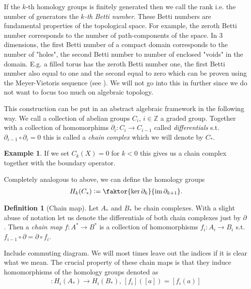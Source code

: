 \documentclass[12pt,a4paper]{article}
\numberwithin{equation}{subsection}
\numberwithin{lemma}{subsection}
\theoremstyle{definition}
\newtheorem{definition}[lemma]{Definition}
\newtheorem{example}[lemma]{Example}
\DeclareMathOperator{\Ima}{im}
\newcommand{\integers}{\mathbb{Z}}
\begin{document}
If the $k$-th homology groups is finitely generated then we 
call the rank i.e. the number of generators the \textit{$k$-th Betti number}. 
These Betti numbers are fundamental properties of the topological space. 
For example, the zeroth Betti number corresponds to the number of 
path-components of the space. In 3 dimensions, the first Betti number of 
a compact domain
corresponds to the number of "holes", the second Betti number to 
number of enclosed "voids" in the domain. E.g. a filled torus 
has the zeroth Betti number one, the first Betti number also equal to one
and the second equal to zero which can be proven using the Meyer-Vietoris sequence
(see \cite[Sec.\,IV.18]{topology_and_geometry}). We will not go into this in further
since we do not want to focus too much on algebraic topology.

This construction can be put in an abstract algebraic framework in the following 
way. We call a collection of abelian groups $C_i$, $i\in \integers$ a graded group.                                                   
Together with a collection of homomorphims $\partial_i: C_i \rightarrow C_{i-1}$ 
called \textit{differentials}
s.t. $\partial_{i-1} \circ \partial_i = 0$ this is called a \textit{chain complex} which 
we will denote by $C_*$. 

\begin{example}
    If we set $C_k(X) = {0}$ for $k < 0$ this gives us a chain complex together with 
    the boundary operator. 
\end{example}

Completely analogous to above, we can define the homology groups 
\begin{align*}
    H_k(C_*) \vcentcolon= \faktor{\ker \partial_k}{\Ima \partial_{k+1}}.
\end{align*}

\begin{definition}[Chain map]
    Let $A_*$ and $B_*$ be chain complexes. With a slight abuse of notation
    let us denote the differentials of 
    both chain complexes just by $\partial$.
    Then a \textit{chain map} $f: A^* \rightarrow B^*$ is a collection 
    of homomorphisms $f_i: A_i \rightarrow B_i$ s.t. 
    $f_{i-1} \circ \partial = \partial \circ f_i$.
\end{definition}
{\color{red} Include commuting diagram.} We will most times leave out the 
indices if it is clear what we mean.
The crucial property of these chain maps is that they induce homomorphisms of
the homology groups denoted as
\begin{align*}
    [f_i]: H_i(A_*) \rightarrow H_i(B_*), \, [f_i]([a]) = [f_i(a)]
\end{align*}
\end{document}
